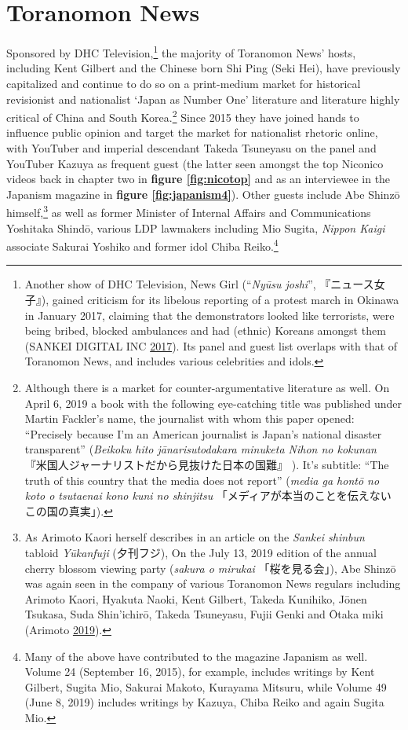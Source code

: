 \documentclass[10pt,british,A4paper,oneside]{memoir}
\begin{document}
\section{Toranomon News}\label{toranomon-news}

Sponsored by DHC Television,\footnote{Another show of DHC Television,
  News Girl (``\emph{Nyūsu joshi}'', 『ニュース女子』), gained criticism
  for its libelous reporting of a protest march in Okinawa in January
  2017, claiming that the demonstrators looked like terrorists, were
  being bribed, blocked ambulances and had (ethnic) Koreans amongst them
  (SANKEI DIGITAL INC
  \protect\hyperlink{ref-sankei_digital_inc_eng._2017}{2017}). Its panel
  and guest list overlaps with that of Toranomon News, and includes
  various celebrities and idols.} the majority of Toranomon News' hosts,
including Kent Gilbert and the Chinese born Shi Ping (Seki Hei), have
previously capitalized and continue to do so on a print-medium market
for historical revisionist and nationalist `Japan as Number One'
literature and literature highly critical of China and South
Korea.\footnote{Although there is a market for counter-argumentative
  literature as well. On April 6, 2019 a book with the following eye-catching
  title was published under Martin Fackler's name, the journalist with whom
  this paper opened: ``Precisely because I'm an American journalist is
  Japan's national disaster transparent'' (\emph{Beikoku hito
  jānarisutodakara minuketa Nihon no kokunan}
  『米国人ジャーナリストだから見抜けた日本の国難』 ). It's subtitle:
  ``The truth of this country that the media does not report''
  (\emph{media ga hontō no koto o tsutaenai kono kuni no shinjitsu}
  「メディアが本当のことを伝えないこの国の真実」).} Since 2015 they have
joined hands to influence public opinion and target the market for
nationalist rhetoric online, with YouTuber and imperial descendant
Takeda Tsuneyasu on the panel and YouTuber Kazuya as frequent guest (the
latter seen amongst the top Niconico videos back in chapter two in
\textbf{figure \ref{fig:nicotop}} and as an interviewee in the
Japanism magazine in \textbf{figure \ref{fig:japanism4}}). Other guests
include Abe Shinzō himself,\footnote{As Arimoto Kaori herself describes
  in an article on the \emph{Sankei shinbun} tabloid \emph{Yūkanfuji}
  (夕刊フジ), On the July 13, 2019 edition of the annual cherry blossom
  viewing party (\emph{sakura o mirukai} 「桜を見る会」), Abe Shinzō was
  again seen in the company of various Toranomon News regulars including
  Arimoto Kaori, Hyakuta Naoki, Kent Gilbert, Takeda Kunihiko, Jōnen
  Tsukasa, Suda Shin'ichirō, Takeda Tsuneyasu, Fujii Genki and Ōtaka
  miki (Arimoto \protect\hyperlink{ref-arimoto_eng._2019}{2019}).} as
well as former Minister of Internal Affairs and Communications Yoshitaka
Shindō, various LDP lawmakers including Mio Sugita, \emph{Nippon Kaigi}
associate Sakurai Yoshiko and former idol Chiba Reiko.\footnote{Many of
  the above have contributed to the magazine Japanism as well. Volume 24
  (September 16, 2015), for example, includes writings by Kent Gilbert,
  Sugita Mio, Sakurai Makoto, Kurayama Mitsuru, while Volume 49 (June 8,
  2019) includes writings by Kazuya, Chiba Reiko and again Sugita Mio.}
\end{document}
